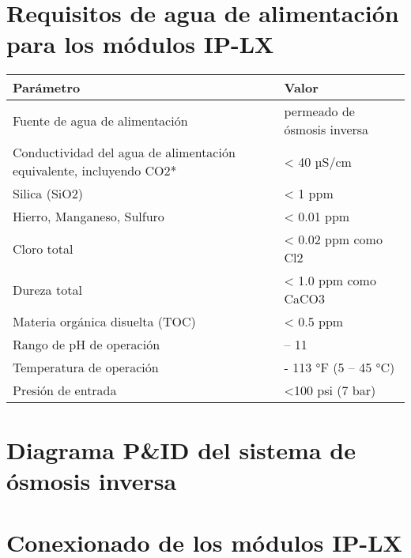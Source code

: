 
\begin{appendixs}

    \fontsize{10}{12}\selectfont



    \section{Requisitos de agua de alimentación para los módulos IP-LX}
    \renewcommand{\arraystretch}{1} %
    \begin{longtable}{|>{\raggedright\arraybackslash}m{8cm} |>{\raggedright\arraybackslash}m{8cm}|}
        \toprule
        \textbf{Parámetro}                                                  & \textbf{Valor}              \\
        \midrule
        Fuente de agua de alimentación                                      & permeado de ósmosis inversa \\
        \hline
        Conductividad del agua de alimentación equivalente, incluyendo CO2* & < 40 µS/cm                  \\
        \hline
        Silica (SiO2)                                                       & < 1 ppm                     \\
        \hline
        Hierro, Manganeso, Sulfuro                                          & < 0.01 ppm                  \\
        \hline
        Cloro total                                                         & < 0.02 ppm como Cl2         \\
        \hline
        Dureza total                                                        & < 1.0 ppm como CaCO3        \\
        \hline
        Materia orgánica disuelta (TOC)                                     & < 0.5 ppm                   \\
        \hline
        Rango de pH de operación                                            & 4 – 11                      \\
        \hline
        Temperatura de operación                                            & 41 - 113 °F (5 – 45 °C)     \\
        \hline
        Presión de entrada                                                  & <100 psi (7 bar)            \\
        \bottomrule
    \end{longtable}
    \section{Diagrama P\&ID del sistema de ósmosis inversa}
    \section{Conexionado de los módulos IP-LX}

\end{appendixs}